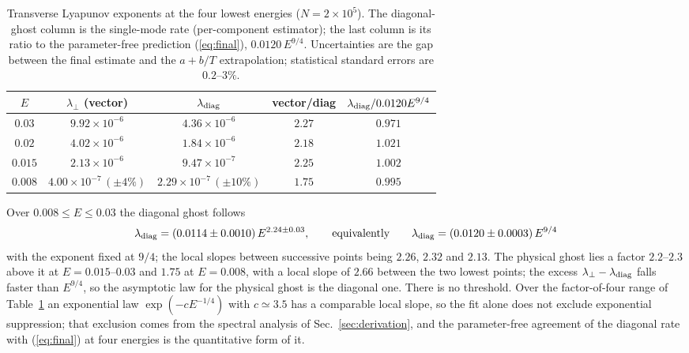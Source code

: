 \documentclass[11pt,a4paper]{article}
\begin{document}
\begin{table}
\centering
\caption{Transverse Lyapunov exponents at the four lowest energies ($N=2\times10^5$). The
diagonal-ghost column is the single-mode rate (per-component estimator); the last column is its
ratio to the parameter-free prediction (\ref{eq:final}), $0.0120\,E^{9/4}$. Uncertainties are
the gap between the final estimate and the $a+b/T$ extrapolation; statistical standard errors
are $0.2$--$3\%$.}
\label{tab:low}
\begin{tabular}{ccccc}
\toprule
$E$ & $\lambda_\perp$ (vector) & $\lambda_{\rm diag}$ & vector/diag & $\lambda_{\rm diag}/0.0120E^{9/4}$\\
\midrule
$0.03$  & $9.92\times10^{-6}$ & $4.36\times10^{-6}$ & $2.27$ & $0.971$\\
$0.02$  & $4.02\times10^{-6}$ & $1.84\times10^{-6}$ & $2.18$ & $1.021$\\
$0.015$ & $2.13\times10^{-6}$ & $9.47\times10^{-7}$ & $2.25$ & $1.002$\\
$0.008$ & $4.00\times10^{-7}\,(\pm4\%)$ & $2.29\times10^{-7}\,(\pm10\%)$ & $1.75$ & $0.995$\\
\bottomrule
\end{tabular}
\end{table}

Over $0.008\le E\le0.03$ the diagonal ghost follows
\begin{equation}
\lambda_{\rm diag}=(0.0114\pm0.0010)\,E^{2.24\pm0.03},
\qquad\text{equivalently}\qquad
\lambda_{\rm diag}=(0.0120\pm0.0003)\,E^{9/4}
\label{eq:fit}
\end{equation}
with the exponent fixed at $9/4$; the local slopes between successive points being $2.26$, $2.32$ and $2.13$. The physical ghost
lies a factor $2.2$--$2.3$ above it at $E=0.015$--$0.03$ and $1.75$ at $E=0.008$, with a local
slope of $2.66$ between the two lowest points; the excess $\lambda_\perp-\lambda_{\rm diag}$
falls faster than $E^{9/4}$, so the asymptotic law for the physical ghost is the diagonal one.
There is no threshold. Over the factor-of-four range of Table~\ref{tab:low} an exponential law
$\exp(-cE^{-1/4})$ with $c\simeq3.5$ has a comparable local slope, so the fit alone does not
exclude exponential suppression; that exclusion comes from the spectral analysis of
Sec.~\ref{sec:derivation}, and the parameter-free agreement of the diagonal rate with
(\ref{eq:final}) at four energies is the quantitative form of it.
\end{document}
